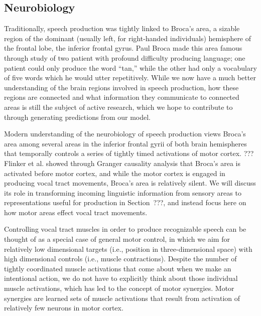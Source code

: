 \subsection{Neurobiology}

Traditionally, speech production
was tightly linked to Broca's area,
a sizable region of the dominant
(usually left, for right-handed individuals)
hemisphere of the frontal lobe,
the inferior frontal gyrus.
Paul Broca made this area famous
through study of two patient
with profound difficulty producing language;
one patient could only produce the word ``tan,''
while the other had only a vocabulary
of five words which he would utter repetitively.
While we now have a much better understanding
of the brain regions
involved in speech production,
how these regions are connected
and what information they communicate
to connected areas is still
the subject of active research,
which we hope to contribute to
through generating predictions
from our model.

Modern understanding of
the neurobiology of speech production
views Broca's area among several
areas in the inferior frontal gyrii
of both brain hemispheres
that temporally controls a series
of tightly timed activations
of motor cortex.
??? Flinker et al.
showed through Granger causality analysis
that Broca's area is activated
before motor cortex,
and while the motor cortex is
engaged in producing vocal tract movements,
Broca's area is relatively silent.
We will discuss its role in
transforming incoming linguistic
information from sensory areas
to representations useful for production
in Section~???,
and instead focus here on
how motor areas effect vocal tract movements.

Controlling vocal tract muscles
in order to produce recognizable speech
can be thought of as a special case of
general motor control,
in which we aim for relatively
low dimensional targets
(i.e., position in three-dimensional space)
with high dimensional controls
(i.e., muscle contractions).
Despite the number of tightly coordinated
muscle activations that come about
when we make an intentional action,
we do not have to explicitly
think about those individual muscle activations,
which has led to the concept
of motor synergies.
Motor synergies are learned sets of
muscle activations that result
from activation of relatively few
neurons in motor cortex.


